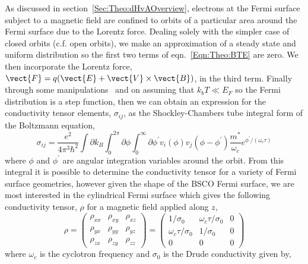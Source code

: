 As discussed in section~\ref{Sec:Theo:dHvAOverview}, electrons at the Fermi surface subject to a magnetic field are confined to orbits of a particular area around the Fermi surface due to the Lorentz force. Dealing solely with the simpler case of closed orbits (c.f. open orbits), we make an approximation of a steady state and uniform distribution so the first two terms of eqn.~\ref{Eqn:Theo:BTE} are zero. We then incorporate the Lorentz force, $\vect{F} = q(\vect{E} + \vect{V}\times\vect{B})$, in the third term. Finally through some manipulations~\cite{French2009} and on assuming that $k_bT \ll E_F$ so the Fermi distribution is a step function, then we can obtain an expression for the conductivity tensor elements, $\sigma_{ij}$, as the Shockley-Chambers tube integral form of the Boltzmann equation,
\begin{equation}
    \sigma_{ij} = \frac{e^2}{4 \pi^3 \hbar^2}\int \partial k_B \int^{2\pi}_{0} \partial \phi \int^{\infty}_{0} \partial \phi^{\prime} v_i(\phi) v_j(\phi - \phi^{\prime})\frac{m^*}{\omega_c}e^{\phi^{\prime}/(\omega_c \tau)}
\end{equation}
where $\phi$ and $\phi^{\prime}$ are angular integration variables around the orbit. From this integral it is possible to determine the conductivity tensor for a variety of Fermi surface geometries, however given the shape of the \ac{BSCO} Fermi surface, we are most interested in the cylindrical Fermi surface which gives the following conductivity tensor, $\rho$ for a magnetic field applied along $z$,
\begin{equation}
    \rho = \left( \begin{array}{ccc}
                \rho_{xx}   & \rho_{xy} & \rho_{xz} \\
                \rho_{yx}   & \rho_{yy} & \rho_{yz} \\
                \rho_{zx}   & \rho_{zy} & \rho_{zz} \end{array} \right) = \left( \begin{array}{ccc}
                                                        1/\sigma_0  & \omega_c \tau / \sigma_0   & 0  \\
                                                        \omega_c \tau / \sigma_0  & 1/\sigma_0  & 0  \\
                                                        0   & 0 & 0  \end{array} \right)
\end{equation}
where $\omega_c$ is the cyclotron frequency and $\sigma_0$ is the Drude conductivity given by,
